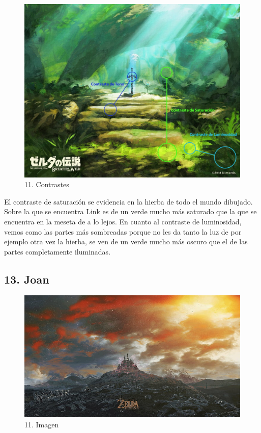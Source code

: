 \documentclass[12pt]{article}
\begin{document}
    \begin{figure}[H]
       \centering
       \includegraphics[scale=0.35]{images/Carlos/12/Contrastes.jpg}
       \caption{\small 11. Contrastes}
    \end{figure}
    El contraste de saturación se evidencia en la hierba de todo el mundo dibujado. Sobre la que se encuentra Link es de un verde mucho más saturado que la que se encuentra en la meseta de a lo lejos. En cuanto al contraste de luminosidad, vemos como las partes más sombreadas porque no les da tanto la luz de por ejemplo otra vez la hierba, se ven de un verde mucho más oscuro que el de las partes completamente iluminadas.
        \newpage


    \subsection{13. Joan}
        \begin{figure}[H]
          \centering
          \includegraphics[scale=0.20]{images/Concepts/13_concept_art.jpg}
          \caption{\small 11. Imagen}
        \end{figure}
\end{document}
